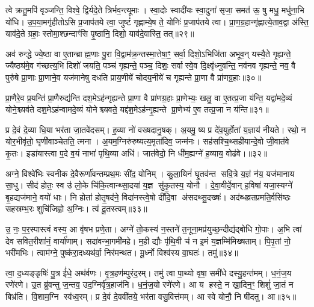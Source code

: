 {\anuvakamend[{उ॒प॒या॒मगृ॑हीतो जुहोमि॒ त्रिच॑त्वारिशच्च॥९॥}]}

त्वे क्रतु॒मपि॑ वृञ्जन्ति॒ विश्वे॒ द्विर्यदे॒ते त्रिर्भव॒न्त्यूमाः। स्वा॒दोः स्वादी॑यः स्वा॒दुना॑ सृजा॒ समत॑ ऊ॒ षु मधु॒ मधु॑ना॒भि यो॑धि। उ॒प॒या॒मगृ॑हीतोऽसि प्र॒जाप॑तये त्वा॒ जुष्टं॑ गृह्णाम्ये॒ष ते॒ योनिः॑ प्र॒जाप॑तये त्वा। प्रा॒ण॒ग्र॒हान्गृ॑ह्णात्ये॒ताव॒द्वा अ॑स्ति॒ याव॑दे॒ते ग्रहाः॒ स्तोमा॒श्छन्दाꣳ॑सि पृ॒ष्ठानि॒ दिशो॒ याव॑दे॒वास्ति॒ तत्॥२९॥

अव॑ रुन्द्धे ज्ये॒ष्ठा वा ए॒तान्ब्राह्म॒णाः पु॒रा वि॒द्वाम॑क्र॒न्तस्मा॒त्तेषा॒ꣳ॒ सर्वा॒ दिशो॒ऽभिजि॑ता अभूव॒न् यस्यै॒ते गृ॒ह्यन्ते॒ ज्यैष्ठ्य॑मे॒व ग॑च्छत्य॒भि दिशो॑ जयति॒ पञ्च॑ गृह्यन्ते॒ पञ्च॒ दिशः॒ सर्वास्वे॒व दि॒क्ष्वृ॑ध्नुवन्ति॒ नव॑नव गृह्यन्ते॒ नव॒ वै पुरु॑षे प्रा॒णाः प्रा॒णाने॒व यज॑मानेषु दधति प्राय॒णीये॑ चोदय॒नीये॑ च गृह्यन्ते प्रा॒णा वै प्रा॑णग्र॒हाः॥३०॥

प्रा॒णैरे॒व प्र॒यन्ति॑ प्रा॒णैरुद्य॑न्ति दश॒मेऽह॑न्गृह्यन्ते प्रा॒णा वै प्रा॑णग्र॒हाः प्रा॒णेभ्यः॒ खलु॒ वा ए॒तत्प्र॒जा य॑न्ति॒ यद्वा॑मदे॒व्यं योने॒श्च्यव॑ते दश॒मेऽह॑न्वामदे॒व्यं योनेश्च्यवते॒ यद्द॑श॒मेऽह॑न्गृ॒ह्यन्ते प्रा॒णेभ्य॑ ए॒व तत्प्र॒जा न य॑न्ति॥३१॥

{\anuvakamend[{तत्प्रा॑णग्र॒हाः स॒प्तत्रिꣳ॑शच्च॥10॥}]}

प्र दे॒वं दे॒व्या धि॒या भर॑ता जा॒तवे॑दसम्। ह॒व्या नो॑ वख्षदानु॒षक्। अ॒यमु॒ ष्य प्र दे॑व॒युर्\mbox{}होता॑ य॒ज्ञाय॑ नीयते। रथो॒ न योर॒भीवृ॑तो॒ घृणी॑वाञ्चेतति॒ त्मना। अ॒यम॒ग्निरु॑रुष्यत्य॒मृता॑दिव॒ जन्म॑नः। सह॑सश्चि॒थ्सही॑यान्दे॒वो जी॒वात॑वे कृ॒तः। इडा॑यास्त्वा प॒दे व॒यं नाभा॑ पृथि॒व्या अधि॑। जात॑वेदो॒ नि धी॑म॒ह्यग्ने॑ ह॒व्याय॒ वोढ॑वे।॥३२॥

अग्ने॒ विश्वे॑भिः स्वनीक दे॒वैरूर्णा॑वन्तम्प्रथ॒मः सी॑द॒ योनिम्। कु॒ला॒यिनं॑ घृ॒तव॑न्त सवि॒त्रे य॒ज्ञं न॑य॒ यज॑मानाय सा॒धु। सीद॑ होतः॒ स्व उ॑ लो॒के चि॑कि॒त्वान्थ्सा॒दया॑ य॒ज्ञ सु॑कृ॒तस्य॒ योनौ। दे॒वा॒वीर्दे॒वान् ह॒विषा॑ यजा॒स्यग्ने॑ बृ॒हद्यज॑माने॒ वयो॑ धाः। नि होता॑ होतृ॒षद॑ने॒ विदा॑नस्त्वे॒षो दी॑दि॒वा अ॑सदथ्सु॒दख्षः॑। अद॑ब्धव्रतप्रमति॒र्वसि॑ष्ठः सहस्रम्भ॒रः शुचि॑जिह्वो अ॒ग्निः। त्वं दू॒तस्त्वम्॥३३॥

उ॒ नः॒ प॒र॒स्पास्त्वं वस्य॒ आ वृ॑षभ प्रणे॒ता। अग्ने॑ तो॒कस्य॑ न॒स्तने॑ त॒नूना॒मप्र॑युच्छ॒न्दीद्य॑द्बोधि गो॒पाः। अ॒भि त्वा॑ देव सवित॒रीशा॑नं॒ वार्या॑णाम्। सदा॑वन्भा॒गमी॑महे। म॒ही द्यौः पृ॑थि॒वी च॑ न इ॒मं य॒ज्ञम्मि॑मिख्षताम्। पि॒पृ॒तां नो॒ भरी॑मभिः। त्वाम॑ग्ने॒ पुष्क॑रा॒दध्यथ॑र्वा॒ निर॑मन्थत। मू॒र्ध्नो विश्व॑स्य वा॒घतः॑। तमु॑॥३४॥

त्वा॒ द॒ध्यङ्ङृषिः॑ पु॒त्र ई॑धे॒ अथ॑र्वणः। वृ॒त्र॒हण॑म्पुरंद॒रम्। तमु॑ त्वा पा॒थ्यो वृषा॒ समी॑धे दस्यु॒हन्त॑मम्। ध॒नं॒ज॒य रणे॑रणे। उ॒त ब्रु॑वन्तु ज॒न्तव॒ उद॒ग्निर्वृ॑त्र॒हाज॑नि। ध॒नं॒ज॒यो रणे॑रणे। आ य हस्ते॒ न खा॒दिन॒ꣳ॒ शिशुं॑ जा॒तं न बिभ्र॑ति। वि॒शाम॒ग्नि स्व॑ध्व॒रम्। प्र दे॒वं दे॒ववी॑तये॒ भर॑ता वसु॒वित्त॑मम्। आ स्वे योनौ॒ नि षी॑दतु। आ॥३५॥

